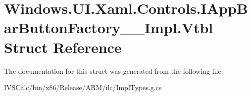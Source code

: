 \hypertarget{struct_windows_1_1_u_i_1_1_xaml_1_1_controls_1_1_i_app_bar_button_factory_____impl_1_1_vtbl}{}\section{Windows.\+U\+I.\+Xaml.\+Controls.\+I\+App\+Bar\+Button\+Factory\+\_\+\+\_\+\+Impl.\+Vtbl Struct Reference}
\label{struct_windows_1_1_u_i_1_1_xaml_1_1_controls_1_1_i_app_bar_button_factory_____impl_1_1_vtbl}


The documentation for this struct was generated from the following file\+:\begin{DoxyCompactItemize}
\item 
I\+V\+S\+Calc/bin/x86/\+Release/\+A\+R\+M/ilc/Impl\+Types.\+g.\+cs\end{DoxyCompactItemize}
